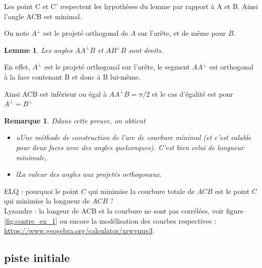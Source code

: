 \documentclass{article}
\newtheorem{lem}{Lemme}
\newtheorem{rem}{Remarque}
\begin{document}
Les point C et C’ respectent les hypothèses du lemme par rapport à A et B. Ainsi l’angle ACB est minimal. 

On note $A^\perp$ est le projeté orthogonal de $A$ sur l’arête, et de même pour $B$.
\begin{lem}
Les angles  $AA^\perp B$ et $AB^\perp B$ sont droits.
\end{lem}
En effet, $A^\perp$ est le projeté orthogonal sur l’arête, le segment $AA^\perp$ est orthogonal à la face contenant B et donc à B lui-même. 

Ainsi ACB est inférieur ou égal à $AA^\perp B=\pi/2$ et le cas d’égalité est pour $A^\perp =B^\perp $

\begin{rem}
Ddans cette preuve, on obtient 
\begin{itemize}
    \item uUne méthode de construction de l’arc de courbure minimal (et c’est valable pour deux faces avec des angles quelconques). C'est bien celui de longueur minimale,
    \item lLa valeur des angles aux projetés orthogonaux. 
\end{itemize}
\end{rem}
ELQ : pourquoi le point $C$ qui minimise la courbure totale de $ACB$ est le point $C$ qui minimise la longueur de $ACB$ ? \\
Lysandre : la longeur de ACB et la courbure ne sont pas corrélées, voir figure \ref{fig:contre_ex_1} ou encore la modélisation des courbes respectives : \url{https://www.geogebra.org/calculator/xrwvnuv3}.


\subsection{piste initiale}
\end{document}
